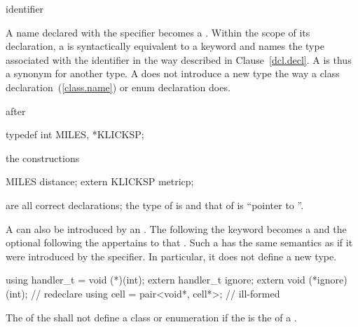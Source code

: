 \begin{bnf}
\br
    identifier
\end{bnf}

A name declared with the  specifier becomes a
. Within the scope of its declaration, a
 is syntactically equivalent to a keyword and
names the type associated with the identifier in the way described in
Clause~\ref{dcl.decl}.
%
%
%
A  is thus a synonym for another type. A
 does not introduce a new type the way a class
declaration~(\ref{class.name}) or enum declaration does.
\begin{example}
%
after

\begin{codeblock}
typedef int MILES, *KLICKSP;
\end{codeblock}

the constructions

\begin{codeblock}
MILES distance;
extern KLICKSP metricp;
\end{codeblock}

are all correct declarations; the type of  is
 and that of  is ``pointer to ''.
\end{example}

\pnum
A  can also be introduced by an
. The  following the
 keyword becomes a 
and the optional  following the
 appertains to that .
Such a  has the same
semantics as if it were introduced by the  specifier. In
particular, it does not define a new type.
\begin{example}

\begin{codeblock}
using handler_t = void (*)(int);
extern handler_t ignore;
extern void (*ignore)(int);         // redeclare 
using cell = pair<void*, cell*>;    // ill-formed
\end{codeblock}

\end{example}
The 
of the  shall not define
a class or enumeration if the 
is the  of a .

